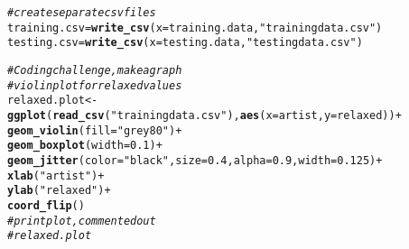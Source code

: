 \documentclass{article}\usepackage[]{graphicx}\usepackage[]{xcolor}
\makeatletter
\newcommand{\hlnum}[1]{\textcolor[rgb]{0.686,0.059,0.569}{#1}}%
\newcommand{\hlsng}[1]{\textcolor[rgb]{0.192,0.494,0.8}{#1}}%
\newcommand{\hlcom}[1]{\textcolor[rgb]{0.678,0.584,0.686}{\textit{#1}}}%
\newcommand{\hlopt}[1]{\textcolor[rgb]{0,0,0}{#1}}%
\newcommand{\hldef}[1]{\textcolor[rgb]{0.345,0.345,0.345}{#1}}%
\newcommand{\hlkwb}[1]{\textcolor[rgb]{0.69,0.353,0.396}{#1}}%
\newcommand{\hlkwc}[1]{\textcolor[rgb]{0.333,0.667,0.333}{#1}}%
\newcommand{\hlkwd}[1]{\textcolor[rgb]{0.737,0.353,0.396}{\textbf{#1}}}%
\newenvironment{kframe}{%
 \def\at@end@of@kframe{}%
 \ifinner\ifhmode%
  \def\at@end@of@kframe{\end{minipage}}%
  \begin{minipage}{\columnwidth}%
 \fi\fi%
 \def\FrameCommand##1{\hskip\@totalleftmargin \hskip-\fboxsep
 \colorbox{shadecolor}{##1}\hskip-\fboxsep
     \hskip-\linewidth \hskip-\@totalleftmargin \hskip\columnwidth}%
 \MakeFramed {\advance\hsize-\width
   \@totalleftmargin\z@ \linewidth\hsize
   \@setminipage}}%
 {\par\unskip\endMakeFramed%
 \at@end@of@kframe}
\newenvironment{knitrout}{}{} %
\makeatother
\begin{document}
\begin{enumerate}
\begin{knitrout}
\begin{kframe}
\begin{alltt}
\hlcom{# create separate csv files}
\hldef{training.csv} \hlkwb{=} \hlkwd{write_csv}\hldef{(}\hlkwc{x}\hldef{=training.data,} \hlsng{"trainingdata.csv"}\hldef{)}
\hldef{testing.csv} \hlkwb{=} \hlkwd{write_csv}\hldef{(}\hlkwc{x}\hldef{=testing.data,} \hlsng{"testingdata.csv"}\hldef{)}


\hlcom{# Coding challenge, make a graph }
\hlcom{# violin plot for relaxed values}
\hldef{relaxed.plot} \hlkwb{<-} \hlkwd{ggplot}\hldef{(}\hlkwd{read_csv}\hldef{(}\hlsng{"trainingdata.csv"}\hldef{),} \hlkwd{aes}\hldef{(}\hlkwc{x}\hldef{=artist,} \hlkwc{y}\hldef{=relaxed))}\hlopt{+}
  \hlkwd{geom_violin}\hldef{(}\hlkwc{fill}\hldef{=}\hlsng{"grey80"}\hldef{)}\hlopt{+}
  \hlkwd{geom_boxplot}\hldef{(}\hlkwc{width} \hldef{=} \hlnum{0.1}\hldef{)}\hlopt{+}
  \hlkwd{geom_jitter}\hldef{(}\hlkwc{color} \hldef{=} \hlsng{"black"}\hldef{,} \hlkwc{size} \hldef{=} \hlnum{0.4}\hldef{,} \hlkwc{alpha} \hldef{=} \hlnum{0.9}\hldef{,} \hlkwc{width} \hldef{=} \hlnum{0.125}\hldef{)}\hlopt{+}
  \hlkwd{xlab}\hldef{(}\hlsng{"artist"}\hldef{)}\hlopt{+}
  \hlkwd{ylab}\hldef{(}\hlsng{"relaxed"}\hldef{)}\hlopt{+}
  \hlkwd{coord_flip}\hldef{()}
\hlcom{# print plot, commented out}
\hlcom{#relaxed.plot}
\end{alltt}
\end{kframe}
\end{knitrout}
\end{enumerate}

\end{document}

